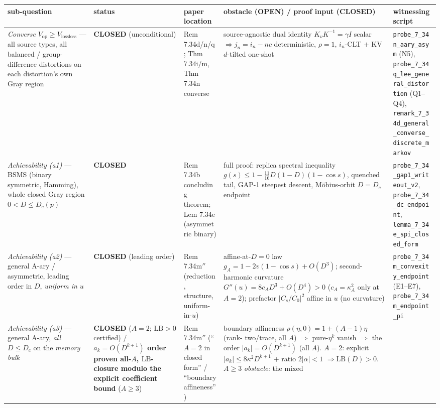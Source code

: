 \documentclass[
]{article}
\begin{document}
\begingroup\footnotesize\sloppy
\setlength{\tabcolsep}{4pt}
\noindent\begin{tabular}{@{}p{3.0cm}p{1.5cm}p{2.6cm}p{2.9cm}p{3.0cm}@{}}
\hline
\textbf{sub-question} & \textbf{status} & \textbf{paper location} &
\textbf{obstacle (OPEN) / proof input (CLOSED)} & \textbf{witnessing script}\\
\hline
\emph{Converse} $V_{\mathrm{op}}\ge V_{\mathrm{lossless}}$ --- all source types,
all balanced / group-difference distortions on each distortion's own Gray region
& \textbf{CLOSED} (unconditional) & Rem 7.34d/n/q; Thm 7.34i/m, Thm 7.34n
converse & source-agnostic dual identity $K_\nu K^{-1}=\gamma I$ scalar
$\Rightarrow j_n=i_n-nc$ deterministic, $\rho=1$, $i_n$-CLT $+$ KV $d$-tilted
one-shot & \texttt{probe\_7\_34n\_aary\_asym} (N5), \texttt{probe\_7\_34q\_lee\_general\_distortion} (Q1--Q4), \texttt{remark\_7\_34d\_general\_converse\_discrete\_markov}\\
\hline
\emph{Achievability (a1)} --- BSMS (binary symmetric, Hamming), whole closed Gray
region $0<D\le D_c(p)$ & \textbf{CLOSED} & Rem 7.34b concluding theorem; Lem
7.34e (asymmetric binary) & full proof: replica spectral inequality
$g(s)\le1-\tfrac{11}{16}D(1-D)(1-\cos s)$, quenched tail, GAP-1 steepest descent,
M\"obius-orbit $D=D_c$ endpoint & \texttt{probe\_7\_34\_gap1\_writeout\_v2}, \texttt{probe\_7\_34\_dc\_endpoint}, \texttt{lemma\_7\_34e\_spi\_closed\_form}\\
\hline
\emph{Achievability (a2)} --- general A-ary / asymmetric, leading order in $D$,
\emph{uniform in $u$} & \textbf{CLOSED} (leading order) & Rem 7.34m$''$
(reduction, structure, uniform-in-$u$) & affine-at-$D{=}0$ law
$g_A=1-2v(1-\cos s)+O(D^3)$; second-harmonic curvature $G''(u)=8c_A
D^3+O(D^4)>0$ ($c_A=\kappa_A^2$ only at $A=2$); prefactor $|C_s/C_0|^2$ affine in $u$ (no curvature) & \texttt{probe\_7\_34m\_convexity\_endpoint} (E1--E7), \texttt{probe\_7\_34m\_endpoint\_pi}\\
\hline
\emph{Achievability (a3)} --- general A-ary, \emph{all} $D\le D_c$ on the
\emph{memory bulk} & \textbf{CLOSED} ($A=2$; $\mathrm{LB}>0$ certified) /
\textbf{$a_k=O(D^{k+1})$ order proven all-$A$, $\mathrm{LB}$-closure modulo the
explicit coefficient bound} ($A\ge3$) & Rem 7.34m$''$ (``$A=2$ in closed form''
/ ``boundary affineness'') & boundary affineness $\rho(\eta,0)=1+(A-1)\eta$ (rank-
two/trace, all $A$) $\Rightarrow$ pure-$\eta^k$ vanish $\Rightarrow$ the order
$|a_k|=O(D^{k+1})$ (all $A$). $A=2$: explicit $|a_k|\le8\kappa^2D^{k+1}$ $+$ ratio
$2|\alpha|<1$ $\Rightarrow\mathrm{LB}(D)>0$. $A\ge3$ \emph{obstacle:} the mixed

\end{tabular}
\end{document}
